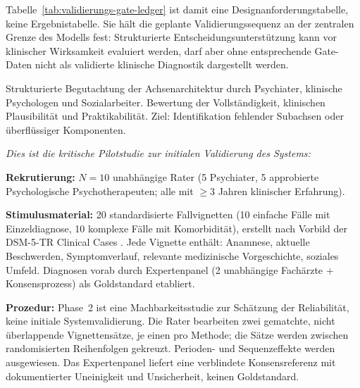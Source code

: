 \documentclass[11pt,a4paper]{article}
\begin{document}
Tabelle~\ref{tab:validierungs-gate-ledger} ist damit eine Designanforderungstabelle, keine Ergebnistabelle. Sie h\"alt die geplante Validierungssequenz an der zentralen Grenze des Modells fest: Strukturierte Entscheidungsunterst\"utzung kann vor klinischer Wirksamkeit evaluiert werden, darf aber ohne entsprechende Gate-Daten nicht als validierte klinische Diagnostik dargestellt werden.

\begin{description}[style=nextline, leftmargin=1.5cm, font=\bfseries]
\item[Phase~1: Expertenbegutachtung (N=10--15)] Strukturierte Begutachtung der Achsenarchitektur durch Psychiater, klinische Psychologen und Sozialarbeiter. Bewertung der Vollst\"andigkeit, klinischen Plausibilit\"at und Praktikabilit\"at. Ziel: Identifikation fehlender Subachsen oder \"uberfl\"ussiger Komponenten.

\item[Phase~2: Inter-Rater-Reliabilit\"atsstudie mit Fallvignetten (N=10 Rater, 20 Vignetten)] \textit{Dies ist die kritische Pilotstudie zur initialen Validierung des Systems:}

\textbf{Rekrutierung:} $N = 10$ unabh\"angige Rater (5 Psychiater, 5 approbierte Psychologische Psychotherapeuten; alle mit $\geq 3$ Jahren klinischer Erfahrung).

\textbf{Stimulusmaterial:} 20 standardisierte Fallvignetten (10 einfache F\"alle mit Einzeldiagnose, 10 komplexe F\"alle mit Komorbidit\"at), erstellt nach Vorbild der DSM-5-TR Clinical Cases \citep{BarnhillDSM5ClinicalCases}. Jede Vignette enth\"alt: Anamnese, aktuelle Beschwerden, Symptomverlauf, relevante medizinische Vorgeschichte, soziales Umfeld. Diagnosen vorab durch Expertenpanel (2 unabh\"angige Fach\"arzte + Konsensprozess) als Goldstandard etabliert.

\textbf{Prozedur:} Phase~2 ist eine Machbarkeitsstudie zur Sch\"atzung der Reliabilit\"at, keine initiale Systemvalidierung. Die Rater bearbeiten zwei gematchte, nicht \"uberlappende Vignettens\"atze, je einen pro Methode; die S\"atze werden zwischen randomisierten Reihenfolgen gekreuzt. Perioden- und Sequenzeffekte werden ausgewiesen. Das Expertenpanel liefert eine verblindete Konsensreferenz mit dokumentierter Uneinigkeit und Unsicherheit, keinen Goldstandard.


\end{description}
\end{document}
